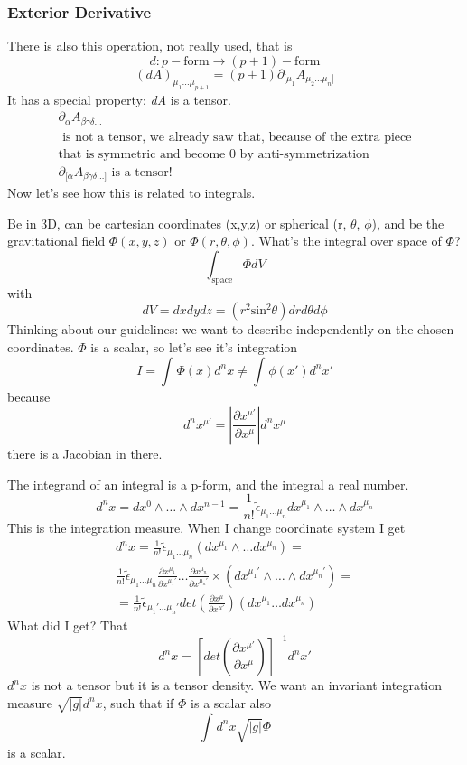 \subsubsection{Exterior Derivative}
There is also this operation, not really used, that is
\[
	d : p-\text{form} \to \left( p+1 \right)-\text{form}
\]
\[
	\left( dA \right)_{\mu _{1}\ldots \mu _{p+1} } = \left( p+1 \right) \partial_{[\mu _{1}}A_{\mu _{2}\ldots \mu _{n}]}
\]
It has a special property: \emph{dA} is a tensor.
\begin{gather}
\partial_{\alpha }A_{\beta  \gamma  \delta \ldots }\\
\text{ is not a tensor, we already saw that, because of the extra piece}\\
\text{that is symmetric and become 0 by anti-symmetrization }\\
\partial_{[\alpha }A_{\beta  \gamma  \delta  \ldots ]} \text{ is a tensor! }
\end{gather}
Now let's see how this is related to integrals.\par
Be in 3D, can be cartesian coordinates (x,y,z) or spherical (r, $\theta $, $\phi $), and be the gravitational field $\Phi\left( x,y,z \right)$ or $\Phi \left( r,\theta ,\phi  \right)$. What's the integral over space of $\Phi $?
\[
	\int_{\text{space}}^{}{\Phi dV}
\]
with 
\[
	dV = dxdydz = \left( r^{2}\text{sin}^{2}\theta  \right)drd\theta d\phi 
\]
Thinking about our guidelines: we want to describe independently on the chosen coordinates. $\Phi $ is a scalar, so let's see it's integration
\[
I = \int_{}^{}{\Phi \left( x \right) d^{n}x} \neq \int_{}^{}{\phi \left( x' \right)d^{n}x'}
\]
because
\[
d^{n}x^{\mu '} = \left| \frac{\partial x^{\mu '}}{\partial x^{\mu }}\right| d^{n}x^{\mu }
\]
there is a Jacobian in there.\par
The integrand of an integral is a p-form, and the integral a real number.
\[
d^{n}x = dx^{0}\wedge \ldots  \wedge dx^{n-1} = \frac{1}{n!} \tilde{\epsilon }_{\mu_{1}\ldots \mu _{n}}dx^{\mu _{1}} \wedge \ldots \wedge dx^{\mu _{n}}
\]
This is the integration measure. When I change coordinate system I get
\begin{gather}
d^{n}x = \frac{1}{n!} \tilde{\epsilon}_{\mu_{1}\ldots \mu _{n}} \left( dx^{\mu _{1}} \wedge \ldots dx^{\mu _{n}} \right) =\\
\frac{1}{n!}\tilde{\epsilon }_{\mu _{1}\ldots \mu _{n}} \frac{\partial x^{\mu _{1}}}{\partial x^{\mu _{1}'}} \ldots \frac{\partial x^{\mu _{n}}}{\partial x^{\mu _{n}'}} \times \left( dx^{\mu _{1}'} \wedge \ldots \wedge dx^{\mu _{n}'} \right) = \\
= \frac{1}{n!} \tilde{\epsilon }_{\mu _{1}' \ldots \mu_{n}'} det\left( \frac{\partial x^{\mu }}{\partial x^{\mu '}}  \right)\left( dx^{\mu_{1}}\ldots dx^{\mu _{n}} \right)
\end{gather}
What did I get? That 
\[
	d^{n}x = \left[ det\left( \frac{\partial x^{\mu' }}{\partial x^{\mu }}  \right)\right]^{-1} d^{n}x'
\]
$d^{n}x$ is not a tensor but it is a tensor density.
We want an invariant integration measure $\sqrt{|g|}d^{n}x$, such that if $\Phi $ is a scalar also
\[
	\int_{}^{}{d^{n}x \sqrt{|g|}\Phi }
\]
is a scalar.\par

